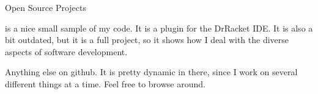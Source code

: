 \begin{rubric}{Open Source Projects}{ 

    \entry* 
    \textbf{}
    is a nice small sample of my code. It is a plugin for the
    DrRacket IDE. It is also a bit outdated, but it is a full
    project, so it shows how I deal with the diverse aspects of
    software development.

    \entry*
        Anything else on github. It is pretty dynamic in there, since I work on
        several different things at a time. Feel free to browse around.

}\end{rubric}
